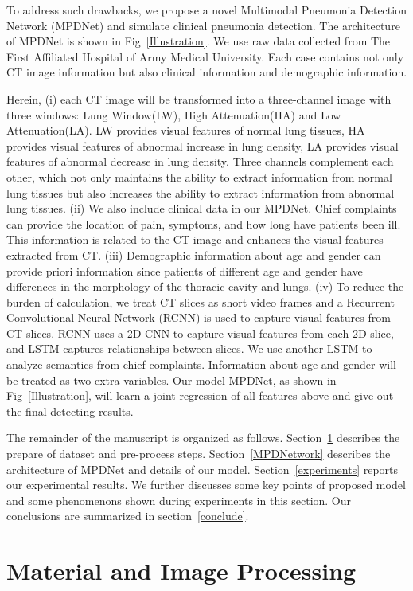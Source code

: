 \documentclass[journal]{IEEEtran}
\begin{document}
To address such drawbacks, we propose a novel Multimodal Pneumonia Detection Network (MPDNet) and simulate clinical pneumonia detection. The architecture of MPDNet is shown in Fig~\ref{Illustration}. We use raw data collected from The First Affiliated Hospital of Army Medical University. Each case contains not only CT image information but also clinical information and demographic information.
 
Herein, (i) each CT image will be transformed into a three-channel image with three windows: Lung Window(LW), High Attenuation(HA) and Low Attenuation(LA). LW provides visual features of normal lung tissues, HA provides visual features of abnormal increase in lung density, LA provides visual features of abnormal decrease in lung density. Three channels complement each other, which not only maintains the ability to extract information from normal lung tissues but also increases the ability to extract information from abnormal lung tissues.
(ii) We also include clinical data in our MPDNet. Chief complaints can provide the location of pain, symptoms, and how long have patients been ill. This information is related to the CT image and enhances the visual features extracted from CT. 
(iii) Demographic information about age and gender can provide priori information since patients of different age and gender have differences in the morphology of the thoracic cavity and lungs. 
(iv) To reduce the burden of calculation, we treat CT slices as short video frames and a Recurrent Convolutional Neural Network (RCNN) is used to capture visual features from CT slices. RCNN uses a 2D CNN to capture visual features from each 2D slice, and LSTM captures relationships between slices. We use another LSTM to analyze semantics from chief complaints. Information about age and gender will be treated as two extra variables. Our model MPDNet, as shown in Fig~\ref{Illustration}, will learn a joint regression of all features above and give out the final detecting results.

The remainder of the manuscript is organized as follows. 
Section~\ref{datasetprocessing} describes the prepare of dataset and pre-process steps.
Section~\ref{MPDNetwork} describes the architecture of MPDNet and details of our model.
Section~\ref{experiments} reports our experimental results. We further discusses some key points of proposed model and some phenomenons shown during experiments in this section.
Our conclusions are summarized in section~\ref{conclude}.


\section{Material and Image Processing}
\label{datasetprocessing}
\end{document}
